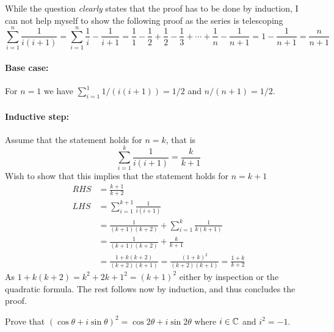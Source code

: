 \documentclass[a4paper, english, 12pt]{article} %
\begin{document}
\begin{answer}
  While the question \emph{clearly} states that the proof has to be done by
  induction, I can not help myself to show the following proof as the series is
  telescoping
  \begin{equation*}
    \sum_{i = 1}^n \frac{1}{i(i+1)}
    = \sum_{i=1}^n \frac{1}{i} - \frac{1}{i+1}
    = \frac{1}{1} - \frac{1}{2} + \frac{1}{2} - \frac{1}{3} + \cdots
    + \frac{1}{n} - \frac{1}{n+1}
    = 1 - \frac{1}{n+1} = \frac{n}{n+1}
  \end{equation*}
  \paragraph{Base case:} For $n=1$ we have $\sum_{i=1}^1 1/(i(i+1)) = 1/2$ and
  $n/(n+1)=1/2$.
  \paragraph{Inductive step:} Assume that the statement holds for $n=k$, that is
  \begin{equation*}
    \sum_{i = 1}^k \frac{1}{i(i+1)} = \frac{k}{k+1}
  \end{equation*}
  Wish to show that this implies that the statement holds for $n=k+1$
  \begin{align*}
    RHS & = \frac{k+1}{k+2} \\
    LHS & = \sum_{i = 1}^{k+1} \frac{1}{i(i+1)} \\
        & = \frac{1}{(k+1)(k+2)} + \sum_{i=1}^{k} \frac{1}{k(k+1)} \\
        & = \frac{1}{(k+1)(k+2)} + \frac{k}{k+1} \\
        & = \frac{1 + k(k+2)}{(k+2)(k+1)} 
          = \frac{(1+k)^2}{(k+2)(k+1)} = \frac{1+k}{k+2}
  \end{align*}
  As $1 + k(k+2) = k^2 + 2k + 1^2 = (k+1)^2$ either by inspection or
  the quadratic formula. The rest follows now by induction, and thus concludes
  the proof.
\end{answer}


\begin{problem}[12]
  \begin{subproblem}
    Prove that $(\cos \theta + i \sin \theta)^2 = \cos 2\theta + i \sin
    2\theta$ where $i \in \mathbb{C}$ and $i^2 = -1$.
  \end{subproblem}
\end{problem}
\end{document}
